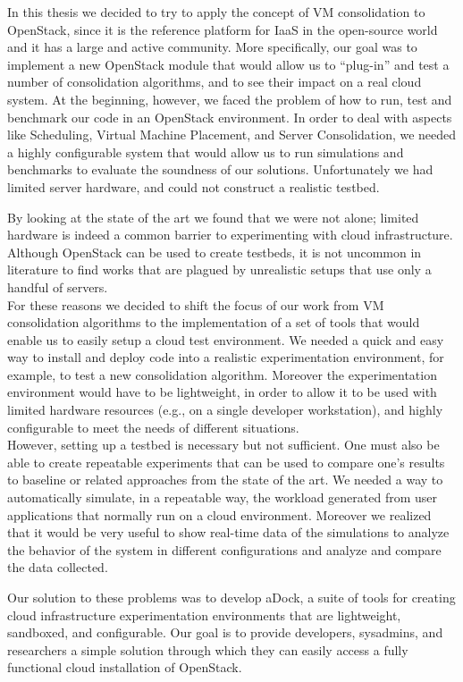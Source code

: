 In this thesis we decided to try to apply the concept of VM consolidation to OpenStack, since it is the reference platform for IaaS in the open-source world and it has a large and active community. More specifically, our goal was to implement a new OpenStack module that would allow us to ``plug-in'' and test a number of consolidation algorithms, and to see their impact on a real cloud system. At the beginning, however, we faced the problem of how to run, test and benchmark our code in an OpenStack environment. In order to deal with aspects like Scheduling, Virtual Machine Placement, and Server Consolidation, we needed a highly configurable system that would allow us to run simulations and benchmarks to evaluate the soundness of our solutions. Unfortunately we had limited server hardware, and could not construct a realistic testbed.

By looking at the state of the art we found that we were not alone; limited hardware is indeed a common barrier to experimenting with cloud infrastructure. Although OpenStack can be used to create testbeds, it is not uncommon in literature to find works that are plagued by unrealistic setups that use only a handful of servers.\\
For these reasons we decided to shift the focus of our work from VM consolidation algorithms to the implementation of a set of tools that would enable us to easily setup a cloud test environment. We needed a quick and easy way to install and deploy code into a realistic experimentation environment, for example, to test a new consolidation algorithm. Moreover the experimentation environment would have to be lightweight, in order to allow it to be used with limited hardware resources (e.g., on a single developer workstation), and highly configurable to meet the needs of different situations.\\
However, setting up a testbed is necessary but not sufficient. One must also be able to create repeatable experiments that can be used to compare one’s results to baseline or related approaches from the state of the art. We needed a way to automatically simulate, in a repeatable way, the workload generated from user applications that normally run on a cloud environment. Moreover we realized that it would be very useful to show real-time data of the simulations to analyze the behavior of the system in different configurations and analyze and compare the data collected.

Our solution to these problems was to develop aDock, a suite of tools for creating cloud infrastructure experimentation environments that are lightweight, sandboxed, and configurable. Our goal is to provide developers, sysadmins, and researchers a simple solution through which they can easily access a fully functional cloud installation of OpenStack.

